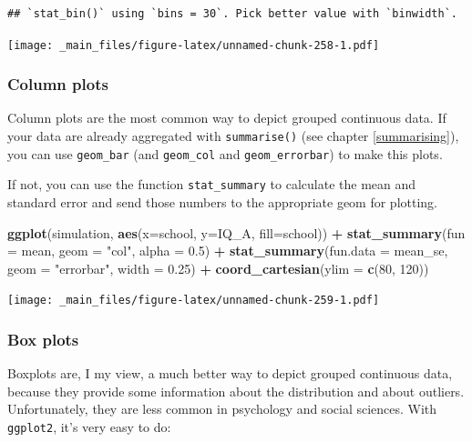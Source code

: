 \documentclass[
]{scrartcl}
\newenvironment{Shaded}{\begin{snugshade}}{\end{snugshade}}
\newcommand{\AttributeTok}[1]{\textcolor[rgb]{0.13,0.29,0.53}{#1}}
\newcommand{\DecValTok}[1]{\textcolor[rgb]{0.00,0.00,0.81}{#1}}
\newcommand{\FloatTok}[1]{\textcolor[rgb]{0.00,0.00,0.81}{#1}}
\newcommand{\FunctionTok}[1]{\textcolor[rgb]{0.13,0.29,0.53}{\textbf{#1}}}
\newcommand{\NormalTok}[1]{#1}
\newcommand{\SpecialCharTok}[1]{\textcolor[rgb]{0.81,0.36,0.00}{\textbf{#1}}}
\newcommand{\StringTok}[1]{\textcolor[rgb]{0.31,0.60,0.02}{#1}}
\begin{document}
\begin{verbatim}
## `stat_bin()` using `bins = 30`. Pick better value with `binwidth`.
\end{verbatim}

\texttt{[image: \_main\_files/figure-latex/unnamed-chunk-258-1.pdf]}

\hypertarget{column-plots}{%
\subsubsection{Column plots}\label{column-plots}}

Column plots are the most common way to depict grouped continuous data. If your data are already aggregated with \texttt{summarise()} (see chapter \ref{summarising}), you can use \texttt{geom\_bar} (and \texttt{geom\_col} and \texttt{geom\_errorbar}) to make this plots.

If not, you can use the function \texttt{stat\_summary} to calculate the mean and standard error and send those numbers to the appropriate geom for plotting.

\begin{Shaded}
\begin{Highlighting}[]
\FunctionTok{ggplot}\NormalTok{(simulation, }\FunctionTok{aes}\NormalTok{(}\AttributeTok{x=}\NormalTok{school, }\AttributeTok{y=}\NormalTok{IQ\_A, }\AttributeTok{fill=}\NormalTok{school)) }\SpecialCharTok{+}
  \FunctionTok{stat\_summary}\NormalTok{(}\AttributeTok{fun =}\NormalTok{ mean, }\AttributeTok{geom =} \StringTok{"col"}\NormalTok{, }\AttributeTok{alpha =} \FloatTok{0.5}\NormalTok{) }\SpecialCharTok{+}
  \FunctionTok{stat\_summary}\NormalTok{(}\AttributeTok{fun.data =}\NormalTok{ mean\_se, }\AttributeTok{geom =} \StringTok{"errorbar"}\NormalTok{, }\AttributeTok{width =} \FloatTok{0.25}\NormalTok{) }\SpecialCharTok{+}
  \FunctionTok{coord\_cartesian}\NormalTok{(}\AttributeTok{ylim =} \FunctionTok{c}\NormalTok{(}\DecValTok{80}\NormalTok{, }\DecValTok{120}\NormalTok{))}
\end{Highlighting}
\end{Shaded}

\texttt{[image: \_main\_files/figure-latex/unnamed-chunk-259-1.pdf]}

\hypertarget{box-plots}{%
\subsubsection{Box plots}\label{box-plots}}

Boxplots are, I my view, a much better way to depict grouped continuous data, because they provide some information about the distribution and about outliers. Unfortunately, they are less common in psychology and social sciences. With \texttt{ggplot2}, it's very easy to do:
\end{document}
